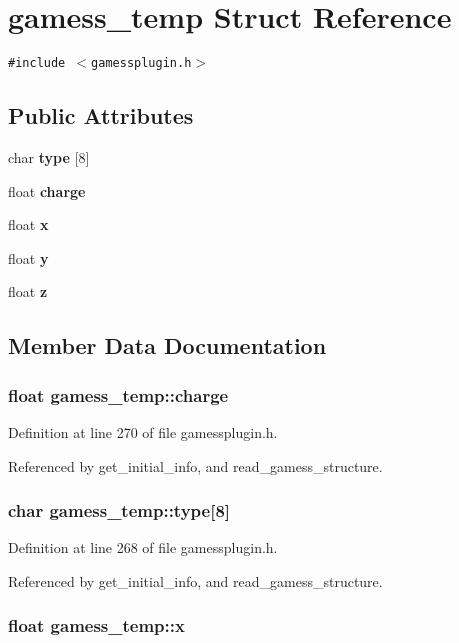 \section{gamess\_\-temp  Struct Reference}
\label{structgamess__temp}
{\tt \#include $<$gamessplugin.h$>$}

\subsection*{Public Attributes}
\begin{CompactItemize}
\item 
char {\bf type} [8]
\item 
float {\bf charge}
\item 
float {\bf x}
\item 
float {\bf y}
\item 
float {\bf z}
\end{CompactItemize}


\subsection{Member Data Documentation}
\subsubsection{\setlength{\rightskip}{0pt plus 5cm}float gamess\_\-temp::charge}\label{structgamess__temp_m1}




Definition at line 270 of file gamessplugin.h.

Referenced by get\_\-initial\_\-info, and read\_\-gamess\_\-structure.
\subsubsection{\setlength{\rightskip}{0pt plus 5cm}char gamess\_\-temp::type[8]}\label{structgamess__temp_m0}




Definition at line 268 of file gamessplugin.h.

Referenced by get\_\-initial\_\-info, and read\_\-gamess\_\-structure.
\subsubsection{\setlength{\rightskip}{0pt plus 5cm}float gamess\_\-temp::x}\label{structgamess__temp_m2}




